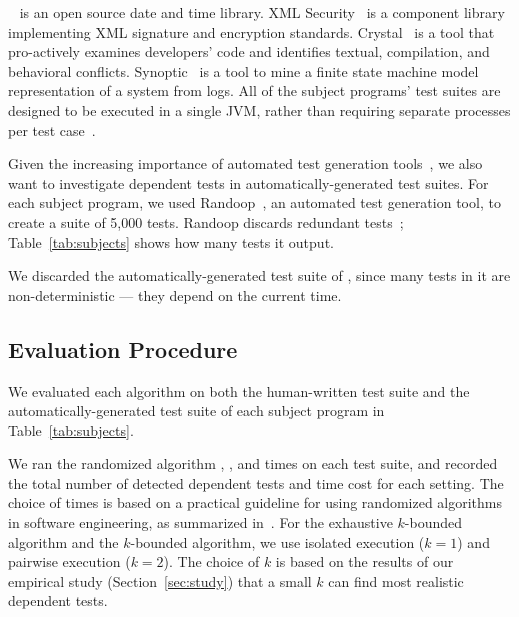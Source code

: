 \jt~\cite{jodatime} is an open source
date and time library.  XML Security~\cite{xmlsecurity}
is a component library implementing XML signature and encryption
standards. 
Crystal~\cite{Brun:2011:PDC, crystal} is a tool that
pro-actively examines developers' code and
identifies textual, compilation, and behavioral conflicts.
Synoptic~\cite{synoptic, Beschastnikh:2011:LEI} is a tool to mine a finite state
machine model representation of a system from logs.
All of the subject programs' test suites are designed to be executed in
a single JVM, rather than requiring separate processes per test case~\cite{vmvm}.

Given the increasing importance of automated test generation
tools~\cite{PachecoLET2007, ZhangSBE2011, Csallner:2004, fraseretal:ISSTA:2011},
we also want to investigate dependent tests in automatically-generated
test suites. For each subject program, we used
Randoop~\cite{PachecoLET2007}, an automated
test generation tool, to create a suite of 5,000 tests.
Randoop discards redundant tests~\cite[\S III.E]{RobinsonEPAL2011};
Table~\ref{tab:subjects} shows how many tests it output.

We discarded the automatically-generated test suite of
\jt, since many tests in it are non-deterministic ---
they depend on the current time.


\tinyrelax %
\subsection{Evaluation Procedure}

We evaluated each algorithm 
on both the human-written test suite 
and the automatically-generated test suite
of each subject program in Table~\ref{tab:subjects}.


We ran the randomized algorithm \smalltrialnum, \mediumtrialnum,
and \trialnum times on each test suite, and recorded
the total number of detected dependent tests and time cost
for each setting. The choice of \trialnum times is based
on a practical guideline for using randomized algorithms
in software engineering, as summarized in~\cite{Arcuri:2011}.
%
For the exhaustive $k$-bounded algorithm
and the \dependenceaware{} $k$-bounded algorithm,
we use isolated execution ($k = 1$) and
pairwise execution ($k = 2$). The choice of $k$ is
based on the results of our empirical
study (Section~\ref{sec:study}) that a small $k$
can find most realistic dependent tests.

